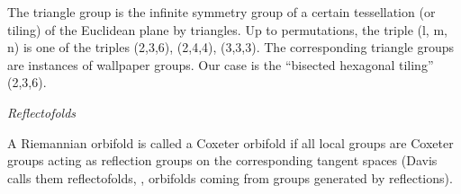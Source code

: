 \begin{description}
The triangle group is the infinite symmetry group of a certain
tessellation (or tiling) of the Euclidean plane by triangles. Up to
permutations, the triple (l, m, n) is one of the triples (2,3,6),
(2,4,4), (3,3,3). The corresponding triangle groups are instances of
wallpaper groups. Our case is the ``bisected hexagonal tiling'' (2,3,6).

%
{\em Reflectofolds}

%
A Riemannian orbifold is called a Coxeter orbifold if all local groups
are Coxeter groups acting as reflection groups on the corresponding
tangent spaces (Davis calls them reflectofolds,
\ie, orbifolds coming from groups generated by reflections).






\end{description}
